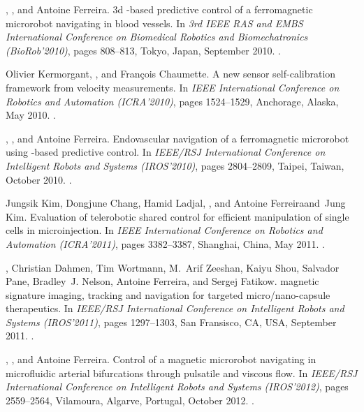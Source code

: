 \begin{Mybibliography}{10}
  \KBelharet, \DavidFolio, and Antoine Ferreira.
  \newblock 3d {\MRI}-based predictive control of a ferromagnetic microrobot
  navigating in blood vessels.
  \newblock In \emph{3rd IEEE RAS and EMBS International Conference on Biomedical
    Robotics and Biomechatronics (BioRob'2010)}, pages 808--813, Tokyo, Japan,
  September 2010{}.
  \newblock {}.
  
  Olivier Kermorgant, \DavidFolio, and François Chaumette.
  \newblock A new sensor self-calibration framework from velocity measurements.
  \newblock In \emph{IEEE International Conference on Robotics and Automation
    (ICRA'2010)}, pages 1524--1529, Anchorage, Alaska, May 2010.
  \newblock {}.
  
  \KBelharet, \DavidFolio, and Antoine Ferreira.
  \newblock Endovascular navigation of a ferromagnetic microrobot using
  {\MRI}-based predictive control.
  \newblock In \emph{IEEE/RSJ International Conference on Intelligent Robots and
    Systems (IROS'2010)}, pages 2804--2809, Taipei, Taiwan, October
  2010{}.
  \newblock {}.
  
  Jungsik Kim, Dongjune Chang, Hamid Ladjal, \DavidFolio, and Antoine
  Ferreiraand~Jung Kim.
  \newblock Evaluation of telerobotic shared control for efficient manipulation
  of single cells in microinjection.
  \newblock In \emph{IEEE International Conference on Robotics and Automation
    (ICRA'2011)}, pages 3382--3387, Shanghai, China, May 2011.
  \newblock {}.
  
 \DavidFolio, Christian Dahmen, Tim Wortmann, M.~Arif Zeeshan, Kaiyu Shou,
 Salvador Pane, Bradley~J. Nelson, Antoine Ferreira, and Sergej Fatikow.
 \newblock {\MRI} magnetic signature imaging, tracking and navigation for
 targeted micro/nano-capsule therapeutics.
 \newblock In \emph{IEEE/RSJ International Conference on Intelligent Robots and
   Systems (IROS'2011)}, pages 1297--1303, San Fransisco, CA, USA, September
 2011.
 \newblock {}.
  
  \KBelharet, \DavidFolio, and Antoine Ferreira.
  \newblock Control of a magnetic microrobot navigating in microfluidic arterial
  bifurcations through pulsatile and viscous flow.
  \newblock In \emph{IEEE/RSJ International Conference on Intelligent Robots and
    Systems (IROS'2012)}, pages 2559--2564, Vilamoura, Algarve, Portugal, October
  2012{}.
  \newblock {}.


\end{Mybibliography}
